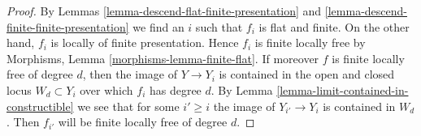 \documentclass[10pt,a4paper]{amsart}
\theoremstyle{plain}
\theoremstyle{definition}
\theoremstyle{remark}
\numberwithin{equation}{subsection}
\begin{document}
\begin{proof}
By
Lemmas \ref{lemma-descend-flat-finite-presentation} and
\ref{lemma-descend-finite-finite-presentation}
we find an $i$ such that $f_i$ is flat and finite.
On the other hand, $f_i$ is locally of finite presentation.
Hence $f_i$ is finite locally free by
Morphisms, Lemma \ref{morphisms-lemma-finite-flat}.
If moreover $f$ is finite locally free of degree $d$,
then the image of $Y \to Y_i$ is contained in the
open and closed locus $W_d \subset Y_i$ over which $f_i$ has degree
$d$. By
Lemma \ref{lemma-limit-contained-in-constructible}
we see that for some $i' \geq i$ the image of $Y_{i'} \to Y_i$
is contained in $W_d$.
Then $f_{i'}$ will be finite locally free of degree $d$.
\end{proof}
\end{document}
